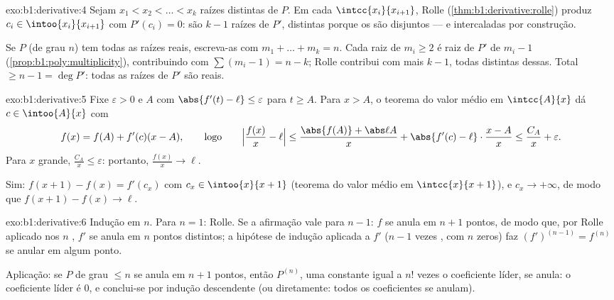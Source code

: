 \begin{solution}{exo:b1:derivative:4}
Sejam $x_1 < x_2 < \dots < x_k$ raízes distintas de $P$. Em cada
$\intcc{x_i}{x_{i+1}}$, Rolle (\cref{thm:b1:derivative:rolle})
produz $c_i \in \intoo{x_i}{x_{i+1}}$ com $P'(c_i) = 0$: são
$k - 1$ raízes de $P'$, distintas porque os   são
disjuntos --- e intercaladas por construção.

Se $P$ (de grau $n$) tem todas as raízes reais, escreva-as com
 $m_1 + \dots + m_k = n$. Cada raiz de 
$m_i \geq 2$ é raiz de $P'$ de  $m_i - 1$
(\cref{prop:b1:poly:multiplicity}), contribuindo com $\sum (m_i - 1) = n
- k$; Rolle contribui com mais $k - 1$, todas distintas dessas. Total
$\geq n - 1 = \deg P'$: todas as raízes de $P'$ são reais.
\end{solution}

\begin{solution}{exo:b1:derivative:5}
Fixe $\varepsilon > 0$ e $A$ com $\abs{f'(t) - \ell} \leq
\varepsilon$ para $t \geq A$. Para $x > A$, o teorema do valor médio em
$\intcc{A}{x}$ dá $c \in \intoo{A}{x}$ com
\[
f(x) = f(A) + f'(c)(x - A),
\qquad\text{logo}\qquad
\Bigl|\frac{f(x)}{x} - \ell\Bigr|
\leq \frac{\abs{f(A)} + \abs\ell A}{x} + \abs{f'(c) - \ell}
\cdot\frac{x - A}{x} \leq \frac{C_A}{x} + \varepsilon .
\]
Para $x$ grande, $\frac{C_A}{x} \leq \varepsilon$: portanto,
$\frac{f(x)}{x} \to \ell$.

Sim: $f(x+1) - f(x) = f'(c_x)$ com $c_x \in \intoo{x}{x+1}$ (teorema do
valor médio em $\intcc{x}{x+1}$), e $c_x \to +\infty$, de modo que
$f(x+1) - f(x) \to \ell$.
\end{solution}

\begin{solution}{exo:b1:derivative:6}
Indução em $n$. Para $n = 1$: Rolle. Se a afirmação vale para $n - 1$:
$f$ se anula em $n+1$ pontos, de modo que, por Rolle aplicado nos $n$
, $f'$ se anula em $n$ pontos distintos; a hipótese de
indução aplicada a $f'$ ($n-1$ vezes , com $n$ zeros) faz
$(f')^{(n-1)} = f^{(n)}$ se anular em algum ponto.

Aplicação: se $P$ de grau $\leq n$ se anula em $n+1$ pontos, então
$P^{(n)}$, uma constante igual a $n!$ vezes o coeficiente líder,
se anula: o coeficiente líder é $0$, e conclui-se por
indução descendente (ou diretamente: todos os coeficientes se anulam).
\end{solution}

